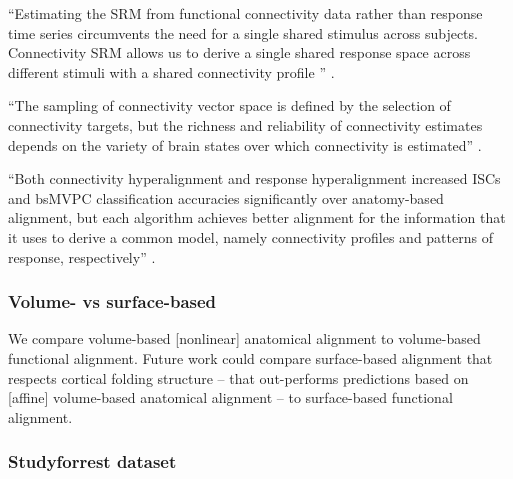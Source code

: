 ``Estimating the SRM from functional connectivity data rather than response time
series circumvents the need for a single shared stimulus across subjects.
%
Connectivity SRM allows us to derive a single shared response space across
different stimuli with a shared connectivity profile
\citep{nastase2019leveraging}'' \citep{kumar2020brainiak}.

%
``The sampling of connectivity vector space is defined by the selection of
connectivity targets, but the richness and reliability of connectivity estimates
depends on the variety of brain states over which connectivity is estimated''
\citep{haxby2020hyperalignment}.

%
``Both connectivity hyperalignment and response hyperalignment increased ISCs
and bsMVPC classification accuracies significantly over anatomy-based alignment,
but each algorithm achieves better alignment for the information that it uses to
derive a common model, namely connectivity profiles and patterns of response,
respectively'' \citep{guntupalli2018computational}.


\subsubsection{Volume- vs surface-based}





We compare volume-based [nonlinear] anatomical alignment to volume-based
functional alignment.
%
Future work could compare surface-based alignment that respects cortical folding
structure -- that out-performs predictions based on [affine] volume-based
anatomical alignment \citep{weiner2018defining} -- to surface-based functional
alignment.


\subsubsection{Studyforrest dataset}


